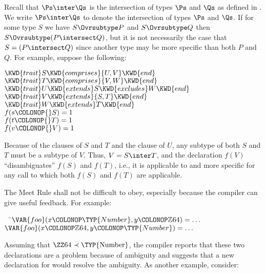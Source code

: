 Recall that $\Ps \inter \Qs$ is the intersection of types $\Ps$ and $\Qs$
as defined in .
We write $\Ps \inter \Qs$ to denote the intersection of types $\Ps$ and $\Qs$.
If for some type $S$ we have $S \Ovrsubtype P$ and $S \Ovrsubtype Q$ then
$S \Ovrsubtype (P \intersect Q)$, but it is not necessarily the
case that $S = (P \intersect Q)$ since another type may be more
specific than both $P$ and $Q$.
\label{adv-over-comprises}
For example, suppose the following:
%
\begin{Fortress}
\(\KWD{trait} S \KWD{comprises} \{U,V\} \KWD{end}\)\\
\(\KWD{trait} T \KWD{comprises} \{V,W\} \KWD{end}\)\\
\(\KWD{trait} U \KWD{extends} S \KWD{excludes} W \KWD{end}\)\\
\(\KWD{trait} V \KWD{extends} \{S,T\} \KWD{end}\)\\
\(\KWD{trait} W \KWD{extends} T \KWD{end}\)\\[4pt]
\(f(s\COLONOP{}S) = 1\)\\
\(f(t\COLONOP{}T) = 1\)\\
\(f(v\COLONOP{}V) = 1\)
\end{Fortress}
Because of the  clauses of $S$ and $T$ and the 
clause of $U$, any subtype of both $S$ and $T$ must be a subtype of
$V$.  Thus, $V = S \inter T$, and the declaration $f(V)$
``disambiguates'' $f(S)$ and $f(T)$, i.e., it is applicable to and more
specific for any call to which both $f(S)$ and $f(T)$ are applicable.

The Meet Rule shall not be difficult to obey, especially because
the compiler can give useful feedback.  For example:

\begin{Fortress}
{\tt~~}\pushtabs\=\+\(  \VAR{foo}(x\COLONOP\TYP{Number}, y\COLONOP\mathbb{Z}64) = \ldots\)\\
\(  \VAR{foo}(x\COLONOP\mathbb{Z}64, y\COLONOP\TYP{Number}) = \ldots\)\-\\\poptabs
\end{Fortress}

Assuming that \(\hbox{\ZZ64} \prec \hbox{\TYP{Number}}\), the compiler
reports that these two declarations are a problem because of ambiguity
and suggests that a new declaration for  would resolve the ambiguity. As another example, consider:

